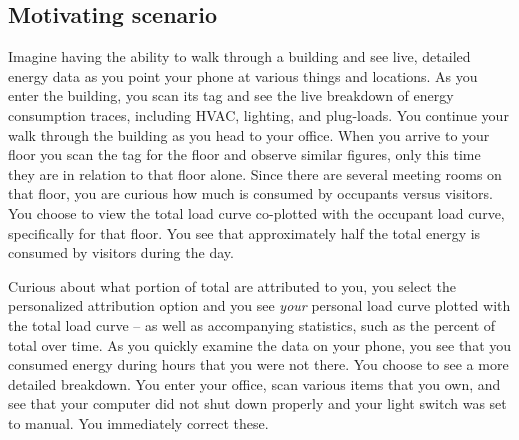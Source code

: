 \subsection{Motivating scenario}
\label{sec:vision}


Imagine having the ability to walk through a building and see live, detailed energy data as
you point your phone at various things and locations.  As you enter the building, you scan its tag and see
the live breakdown of energy consumption traces, including HVAC, lighting, and plug-loads.  You continue
your walk through the building as you head to your office.  When you arrive to your floor
you scan the tag for the floor and observe similar figures, only this time they are in relation to that floor
alone.  Since there are several meeting rooms on that floor, you are curious how much is consumed by 
occupants versus visitors.  You choose to view the total load curve co-plotted with the occupant
load curve, specifically for that floor.  You see that approximately half the total energy is consumed
by visitors during the day.  

Curious about what portion of total are attributed to you, you select the 
personalized attribution option and you see \emph{your} personal load curve plotted
with the total load curve -- as well as accompanying statistics, such as the percent of total over time.
As you quickly examine the data on your phone, you see that you consumed energy during hours that you were not
there.  You choose to see a more detailed breakdown.  You enter your office, scan various items that you own, and see that
your computer did not shut down properly and your light switch was set to manual.  You immediately 
correct these.

